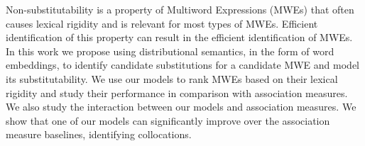 Non-substitutability is a property of Multiword Expressions (MWEs) that often causes lexical rigidity and is relevant for most types of MWEs. Efficient identification of this property can result in the efficient identification of MWEs. In this work we propose using distributional semantics, in the form of word embeddings, to identify candidate substitutions for a candidate MWE and model its substitutability. We use our models to rank MWEs based on their lexical rigidity and study their performance in comparison with association measures. We also study the interaction between our models and association measures. We show that one of our models can significantly improve over the association measure baselines, identifying collocations.
